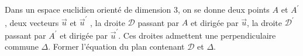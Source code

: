 Dans un espace euclidien orient\'e de dimension 3, on se donne deux points $A$ et $A^\prime$, deux vecteurs $\overrightarrow{u}$ et $\overrightarrow{u}^\prime$ , la droite $\mathcal D$ passant par $A$ et dirig\'ee par $\overrightarrow{u}$, la droite $\mathcal D ^\prime$ passant par $A^\prime$ et dirig\'ee par $\overrightarrow{u}^\prime$. Ces droites admettent une perpendiculaire commune $\Delta$. Former l'\'equation du plan contenant $\mathcal D$ et $\Delta$.
\begin{displaymath}
\end{displaymath}
\bigskip

